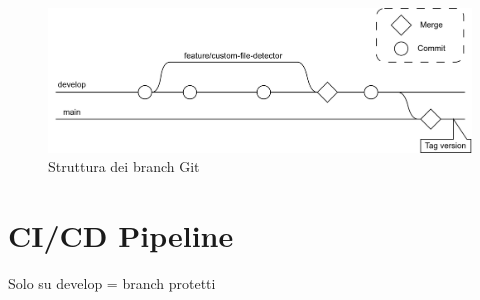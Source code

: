 \begin{figure}[h!]
    \centering
    \includegraphics[width=\textwidth]{assets/git_branches_diagram.png}
    \caption{Struttura dei branch Git}
    \label{fig:git_branches_diagram}
\end{figure}

\section{CI/CD Pipeline}
Solo su develop = branch protetti